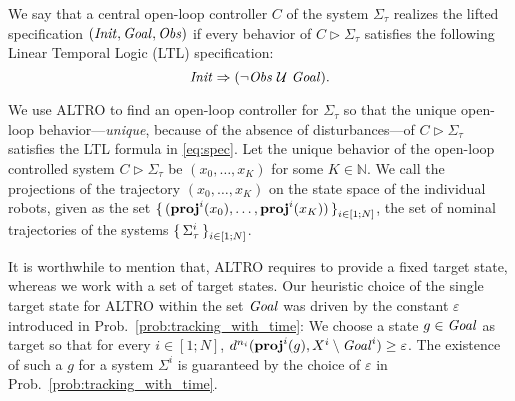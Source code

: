 We say that a central open-loop controller $C$ of the system $\Sigma_\tau$ realizes the lifted specification $(\mathit{Init},\mathit{Goal},\mathit{Obs})$ if every behavior of $C\triangleright \Sigma_\tau$ satisfies the following Linear Temporal Logic (LTL) specification:
\begin{equation}\label{eq:spec}
	\mathit{Init} \Rightarrow (\lnot \mathit{Obs} \ \mathcal{U}\ \mathit{Goal}).
\end{equation} 

We use ALTRO to find an open-loop controller for $\Sigma_\tau$ so that the unique open-loop behavior---\emph{unique}, because of the absence of disturbances---of $C \triangleright\Sigma_\tau$ satisfies the LTL formula in \eqref{eq:spec}.
Let the unique behavior of the  open-loop controlled system $C \triangleright\Sigma_\tau$ be $(x_0,\ldots,x_K)$ for some $K\in \mathbb{N}$.
We call the projections of the trajectory $(x_0,\ldots,x_K)$ on the state space of the individual robots, given as the set $\set{(\mathbf{proj}^i(x_0),\ldots,\mathbf{proj}^i(x_K))}_{i\in [1;N]}$, the set of nominal trajectories of the systems $\set{\Sigma^i_\tau}_{i\in [1;N]}$.

It is worthwhile to mention that, ALTRO requires to provide a fixed target state, whereas we work with a set of target states.
Our heuristic choice of the single target state for ALTRO within the set $\mathit{Goal}$ was driven by the constant $\varepsilon$ introduced in Prob.~\ref{prob:tracking_with_time}:
We choose a state $g\in \mathit{Goal}$ as target so that for every $i\in [1;N]$, $d^{n_i}(\mathbf{proj}^i(g), X^i\setminus \mathit{Goal}^i) \geq \varepsilon$.
The existence of such a $g$ for a system $\Sigma^i$ is guaranteed by the choice of $\varepsilon$ in Prob.~\ref{prob:tracking_with_time}.

%
%	

